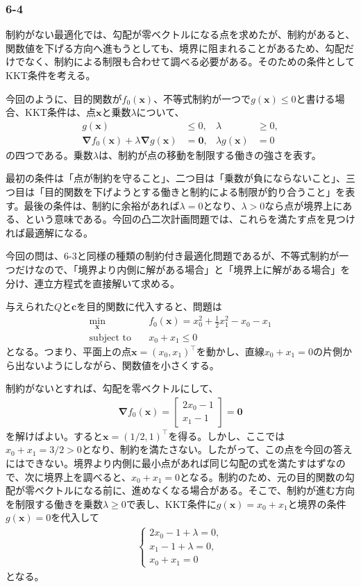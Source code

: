 \documentclass[a4j]{jarticle}
\begin{document}
\subsubsection{6-4}
制約がない最適化では、勾配が零ベクトルになる点を求めたが、制約があると、関数値を下げる方向へ進もうとしても、境界に阻まれることがあるため、勾配だけでなく、制約による制限も合わせて調べる必要がある。そのための条件としてKKT条件を考える。

今回のように、目的関数が$f_0(\bm{x})$、不等式制約が一つで$g(\bm{x})\le0$と書ける場合、KKT条件は、点$\bm{x}$と乗数$\lambda$について、
\begin{align}
  g(\bm{x})&\le0, &\lambda&\ge0,\\
  \bm{\nabla}f_0(\bm{x})+\lambda\bm{\nabla}g(\bm{x})&=\bm{0},
  &\lambda g(\bm{x})&=0
  \label{eq:kkt-intro-task64}
\end{align}
の四つである。乗数$\lambda$は、制約が点の移動を制限する働きの強さを表す。

最初の条件は「点が制約を守ること」、二つ目は「乗数が負にならないこと」、三つ目は「目的関数を下げようとする働きと制約による制限が釣り合うこと」を表す。最後の条件は、制約に余裕があれば$\lambda=0$となり、$\lambda>0$なら点が境界上にある、という意味である。今回の凸二次計画問題では、これらを満たす点を見つければ最適解になる。

今回の問は、6-3と同様の種類の制約付き最適化問題であるが、不等式制約が一つだけなので、「境界より内側に解がある場合」と「境界上に解がある場合」を分け、連立方程式を直接解いて求める。

与えられた$Q$と$\bm{c}$を目的関数に代入すると、問題は
\begin{align}
  \min_{\bm{x}}\quad &f_0(\bm{x})=x_0^2+\frac12x_1^2-x_0-x_1\\
  \text{subject to}\quad &x_0+x_1\le0
\end{align}
となる。つまり、平面上の点$\bm{x}=(x_0,x_1)^\top$を動かし、直線$x_0+x_1=0$の片側から出ないようにしながら、関数値を小さくする。

制約がないとすれば、勾配を零ベクトルにして、
\begin{align}
  \bm{\nabla}f_0(\bm{x})
  =\begin{bmatrix}2x_0-1\\x_1-1\end{bmatrix}
  =\bm{0}
\end{align}
を解けばよい。すると$\bm{x}=(1/2,1)^\top$を得る。しかし、ここでは$x_0+x_1=3/2>0$となり、制約を満たさない。したがって、この点を今回の答えにはできない。境界より内側に最小点があれば同じ勾配の式を満たすはずなので、次に境界上を調べると、$x_0+x_1=0$となる。制約のため、元の目的関数の勾配が零ベクトルになる前に、進めなくなる場合がある。そこで、制約が進む方向を制限する働きを乗数$\lambda\ge0$で表し、KKT条件に$g(\bm{x})=x_0+x_1$と境界の条件$g(\bm{x})=0$を代入して
\begin{align}
  \begin{cases}
    2x_0-1+\lambda=0,\\
    x_1-1+\lambda=0,\\
    x_0+x_1=0
  \end{cases}
  \label{eq:qp-kkt}
\end{align}
となる。
\end{document}
